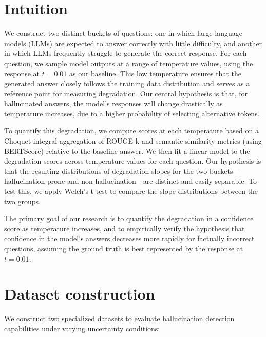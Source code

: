 \documentclass[sigconf]{acmart}
\begin{document}
\section{Intuition}

We construct two distinct buckets of questions: one in which large language models (LLMs) are expected to answer correctly with little difficulty, and another in which LLMs frequently struggle to generate the correct response. For each question, we sample model outputs at a range of temperature values, using the response at $t = 0.01$ as our baseline. This low temperature ensures that the generated answer closely follows the training data distribution and serves as a reference point for measuring degradation. Our central hypothesis is that, for hallucinated answers, the model's responses will change drastically as temperature increases, due to a higher probability of selecting alternative tokens.

To quantify this degradation, we compute scores at each temperature based on a Choquet integral aggregation of ROUGE-k \cite{lin2004rouge} and semantic similarity metrics (using BERTScore) \cite{bertscore} relative to the baseline answer. We then fit a linear model to the degradation scores across temperature values for each question. Our hypothesis is that the resulting distributions of degradation slopes for the two buckets—hallucination-prone and non-hallucination—are distinct and easily separable. To test this, we apply Welch's t-test to compare the slope distributions between the two groups.

The primary goal of our research is to quantify the degradation in a confidence score as temperature increases, and to empirically verify the hypothesis that confidence in the model's answers decreases more rapidly for factually incorrect questions, assuming the ground truth is best represented by the response at $t = 0.01$.


\section{Dataset construction}

We construct two specialized datasets to evaluate hallucination detection capabilities under varying uncertainty conditions:
\end{document}
